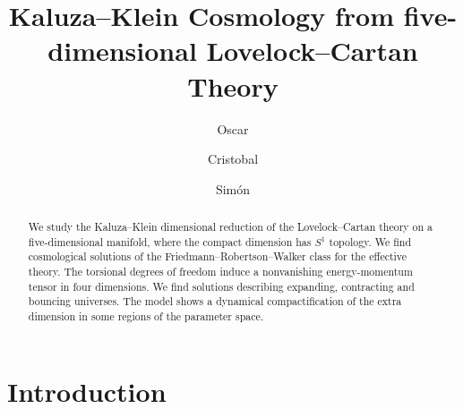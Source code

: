 \documentclass[aps,prd,12pt,superscriptaddress,showpacs,showkeys,longbibliography,reprint,nofootinbib]{revtex4-1}
\begin{document}
\title{Kaluza--Klein Cosmology from five-dimensional Lovelock--Cartan Theory}

\author{Oscar }

\author{Cristobal }

\author{Sim\'on }


\begin{abstract}
  We study the Kaluza--Klein dimensional reduction of the Lovelock--Cartan theory on a five-dimensional manifold, where the compact dimension has $S^1$ topology. We find cosmological solutions of the Friedmann--Robertson--Walker class for the effective theory. The torsional degrees of freedom induce a nonvanishing energy-momentum tensor in four dimensions. We find solutions describing expanding, contracting and bouncing universes. The model shows a dynamical compactification of the extra dimension in some regions of the parameter space. 
\end{abstract}



\maketitle

\section{Introduction}
\end{document}
